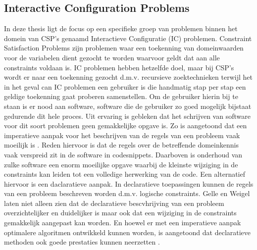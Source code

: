 \subsection{Interactive Configuration Problems}
In deze thesis ligt de focus op een specifieke groep van problemen binnen het domein van CSP's genaamd Interactieve Configuratie (IC) problemen. Constraint Satisfaction Problems zijn problemen waar een toekenning van domeinwaarden voor de variabelen dient gezocht te worden waarvoor geldt dat aan alle constraints voldaan is. IC problemen hebben hetzelfde doel, maar bij CSP's wordt er naar een toekenning gezocht d.m.v. recursieve zoektechnieken terwijl het in het geval can IC problemen een gebruiker is die handmatig stap per stap een geldige toekenning gaat proberen samenstellen. Om de gebruiker hierin bij te staan is er nood aan software, software die de gebruiker zo goed mogelijk bijstaat gedurende dit hele proces. Uit ervaring is gebleken dat het schrijven van software voor dit soort problemen geen gemakkelijke opgave is. Zo is aangetoond dat een imperatieve aanpak voor het beschrijven van de regels van een probleem vaak moeilijk is \citep{gelle1996interactive}. Reden hiervoor is dat de regels over de betreffende domeinkennis vaak verspreid zit in de software in codesnippets. Daarboven is onderhoud van zulke software een enorm moeilijke opgave waarbij de kleinste wijziging in de constraints kan leiden tot een volledige herwerking van de code. Een alternatief hiervoor is een daclaratieve aanpak. In declaratieve toepassingen kunnen de regels van een probleem beschreven worden d.m.v. logische constraints. Gelle en Weigel \cite{gelle1996interactive} laten niet alleen zien dat de declaratieve bescvhrijving van een probleem overzichtelijker en duidelijker is maar ook dat een wijziging in de constraints gemakkelijk aangepast kan worden. En hoewel er met een imperatieve aanpak optimalere algoritmen ontwikkeld kunnen worden, is aangetoond dat declaratieve methoden ook goede prestaties kunnen neerzetten \citep{vlaeminck2009logical}. 

